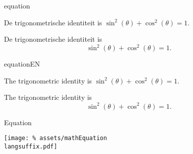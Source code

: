 \copyrightVincent


\begin{saveblock}{equation}
	\begin{highlightblock}[gobble=8,linewidth=\textwidth,
		framexleftmargin=0.25em,xleftmargin=0.25em]
		De trigonometrische identiteit is
		$ \sin^2(\theta) + \cos^2(\theta) = 1 $.

		De trigonometrische identiteit is 
		\begin{equation}
			\sin^2(\theta) + \cos^2(\theta) = 1.
		\end{equation}
	\end{highlightblock}
\end{saveblock}

\begin{saveblock}{equationEN}
	\begin{highlightblock}[gobble=8,linewidth=\textwidth,
		framexleftmargin=0.25em,xleftmargin=0.25em]
		The trigonometric identity is
		$ \sin^2(\theta) + \cos^2(\theta) = 1 $.

		The trigonometric identity is
		\begin{equation}
			\sin^2(\theta) + \cos^2(\theta) = 1.
		\end{equation}
	\end{highlightblock}
\end{saveblock}



\begin{frame}{Equation}

	\texttt{[image: \%
		assets/mathEquation\\langsuffix.pdf]}

\end{frame}


